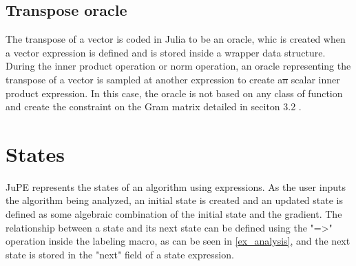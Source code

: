 
\subsection*{Transpose oracle}

The transpose of a vector is coded in Julia to be an oracle, whic is created when a vector expression is defined and is stored inside a wrapper data structure. During the inner product operation or norm operation, an oracle representing the transpose of a vector is sampled at another expression to create a\sout{n} scalar inner product expression. In this case, the oracle is not based on any class of function and create the constraint on the Gram matrix detailed in seciton 3.2 .

\section{States}
JuPE represents the states of an algorithm using expressions. As the user inputs the algorithm being analyzed, an initial state is created and an updated state is defined as some algebraic combination of the initial state and the gradient. The relationship between a state and its next state can be defined using the "=>"  operation inside the labeling macro, as can be seen in \ref{ex_analysis}, and the next state is stored in the "next"  field of a state expression.

